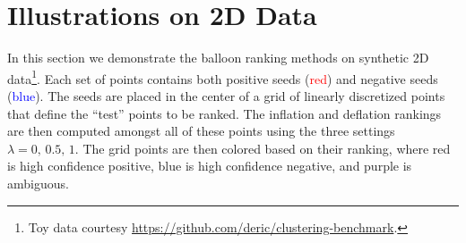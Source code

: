 \documentclass[11pt, oneside, fleqn, UTF8]{article} 	%
\theoremstyle{definition}
\renewcommand{\th}[1]{$#1^{\textrm{th}}$}
\newcommand{\tm}[0]{\tilde{m}}
\newcommand{\rmP}[0]{\mathrm{P}}
\newcommand{\rmS}[0]{\mathrm{S}}
\newcommand{\ti}[0]{\tilde{i}}
\begin{document}



\section{Illustrations on 2D Data}
In this section we demonstrate the balloon ranking methods on synthetic 2D data\footnote{Toy data courtesy \href{https://github.com/deric/clustering-benchmark}{https://github.com/deric/clustering-benchmark}.}.  Each set of points contains both positive seeds (\textcolor{red}{red}) and negative seeds (\textcolor{blue}{blue}).  The seeds are placed in the center of a grid of linearly discretized points that define the ``test'' points to be ranked.  The inflation and deflation rankings are then computed amongst all of these points using the three settings $\lambda = 0, \, 0.5, \, 1$.  The grid points are then colored based on their ranking, where red is high confidence positive, blue is high confidence negative, and purple is ambiguous.
\end{document}
